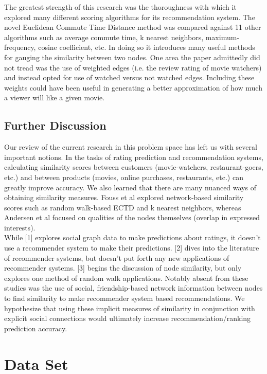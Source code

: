 \documentclass[10pt]{article}
\begin{document}
The greatest strength of this research was the thoroughness with which it explored many different scoring algorithms for its recommendation system. The novel Euclidean Commute Time Distance method was compared against 11 other algorithms such as average commute time, k nearest neighbors, maximum-frequency, cosine coefficient, etc. In doing so it introduces many useful methods for gauging the similarity between two nodes. One area the paper admittedly did not tread was the use of weighted edges (i.e. the review rating of movie watchers) and instead opted for use of watched versus not watched edges. Including these weights could have been useful in generating a better approximation of how much a viewer will like a given movie. \\


\subsection{Further Discussion}
Our review of the current research in this problem space has left us with several important notions. In the tasks of rating prediction and recommendation systems, calculating similarity scores between customers (movie-watchers, restaurant-goers, etc.) and between products (movies, online purchases, restaurants, etc.) can greatly improve accuracy. We also learned that there are many nuanced ways of obtaining similarity measures. Fouss et al explored network-based similarity scores such as random walk-based ECTD and k nearest neighbors, whereas Andersen et al focused on qualities of the nodes themselves (overlap in expressed interests). \\

While [1] explores social graph data to make predictions about ratings, it doesn't use a recommender system to make their predictions. [2] dives into the literature of recommender systems, but doesn't put forth any new applications of recommender systems. [3] begins the discussion of node similarity, but only explores one method of random walk applications. Notably absent from these studies was the use of social, friendship-based network information between nodes to find similarity to make recommender system based recommendations. We hypothesize that using these implicit measures of similarity in conjunction with explicit social connections would ultimately increase recommendation/ranking prediction accuracy.

\label{sec:verify}

\section{Data Set}
\end{document}
